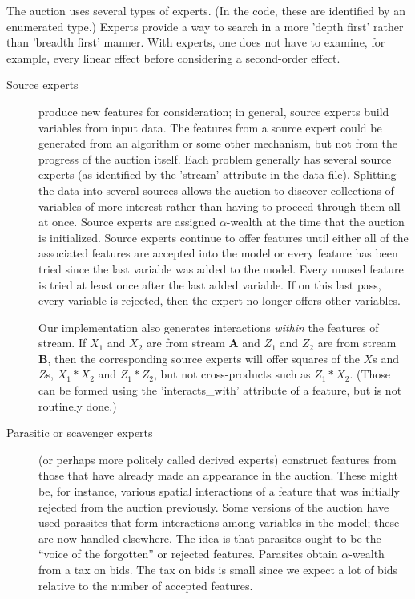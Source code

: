 \documentclass[12pt]{article}
\begin{document}
 The auction uses several types of experts.  (In the code, these are identified
 by an enumerated type.)  Experts provide a way to search in a more 'depth
 first' rather than 'breadth first' manner.  With experts, one does not have to
 examine, for example, every linear effect before considering a second-order
 effect.
\begin{description}

\item[Source experts] produce new features for consideration; in general, source
 experts build variables from input data.  The features from a source expert
 could be generated from an algorithm or some other mechanism, but not from the
 progress of the auction itself.  Each problem generally has several source
 experts (as identified by the 'stream' attribute in the data file).  Splitting
 the data into several sources allows the auction to discover collections of
 variables of more interest rather than having to proceed through them all at
 once.  Source experts are assigned $\alpha$-wealth at the time that the auction
 is initialized.  Source experts continue to offer features until either all of
 the associated features are accepted into the model or every feature has been
 tried since the last variable was added to the model.  Every unused feature is
 tried at least once after the last added variable.  If on this last pass, every
 variable is rejected, then the expert no longer offers other variables.

 Our implementation also generates interactions {\em within}
 the features of stream.  If $X_1$ and $X_2$ are from stream {\bf A} and $Z_1$
 and $Z_2$ are from stream {\bf B}, then the corresponding source experts will
 offer squares of the $X$s and $Z$s, $X_1*X_2$ and $Z_1*Z_2$, but not
 cross-products such as $Z_1*X_2$.  (Those can be formed using the
 'interacts\_with' attribute of a feature, but is not routinely done.)

\item[Parasitic or scavenger experts] (or perhaps more politely called derived
 experts) construct features from those that have already made an appearance in
 the auction.  These might be, for instance, various spatial interactions of a
 feature that was initially rejected from the auction previously.  Some versions
 of the auction have used parasites that form interactions among variables in
 the model; these are now handled elsewhere.  The idea is that parasites ought
 to be the ``voice of the forgotten'' or rejected features.  Parasites obtain
 $\alpha$-wealth from a tax on bids.  The tax on bids is small since we expect a
 lot of bids relative to the number of accepted features.


\end{description}
\end{document}

